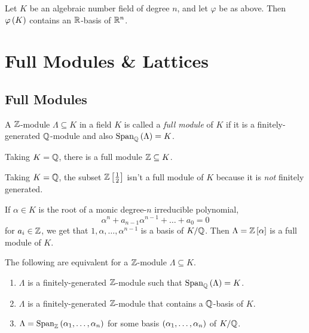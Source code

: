 \documentclass[11pt]{article}
\begin{document}
\begin{proposition}
Let $K$ be an algebraic number field of degree $n$, and let $\varphi$ be as above. Then $\varphi\left( K \right)$ contains an $\mathbb{R}$-basis of $\mathbb{R}^n$.
\end{proposition}


\section{Full Modules \& Lattices}

\subsection{Full Modules}

\begin{definition}
A $\mathbb{Z}$-module $\Lambda \subseteq K$ in a field $K$ is called a \emph{full module} of $K$ if it is a finitely-generated $\mathbb{Q}$-module and also $\operatorname{Span}_{\mathbb{Q}}\left( \Lambda \right) = K$.
\end{definition}

\begin{example}
Taking $K = \mathbb{Q}$, there is a full module $\mathbb{Z} \subseteq K$.
\end{example}

\begin{example}
Taking $K = \mathbb{Q}$, the subset $\mathbb{Z}\left[ \frac{1}{2} \right]$ isn't a full module of $K$ because it is \emph{not} finitely generated.
\end{example}

\begin{example}
If $\alpha \in K$ is the root of a monic degree-$n$ irreducible polynomial,
\[\alpha^n + a_{n-1} \alpha^{n-1} + \ldots + a_0 = 0\]
for $a_i \in \mathbb{Z}$, we get that $1, \alpha, \ldots, \alpha^{n-1}$ is a basis of $K/\mathbb{Q}$.
Then $\Lambda = \mathbb{Z}\left[ \alpha \right]$ is a full module of $K$.
\end{example}

\begin{lemma}
The following are equivalent for a $\mathbb{Z}$-module $\Lambda \subseteq K$.

\begin{enumerate}
\item $\Lambda$ is a finitely-generated $\mathbb{Z}$-module such that $\operatorname{Span}_{\mathbb{Q}}\left( \Lambda \right) = K$.
\item $\Lambda$ is a finitely-generated $\mathbb{Z}$-module that contains a $\mathbb{Q}$-basis of $K$.
\item $\Lambda = \operatorname{Span}_{\mathbb{Z}}\left( \alpha_1, \ldots, \alpha_n \right)$ for some basis $\left( \alpha_1, \ldots, \alpha_n \right)$ of $K/\mathbb{Q}$. 
\end{enumerate}
\end{lemma}
\end{document}
